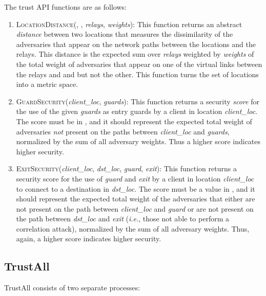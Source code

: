 \documentclass[conference]{styles/IEEEtran}
\newcommand{\ie}{\emph{i.e.}}
\newcommand{\compactify}{\settowidth{\labelsep}{o} \settowidth{\labelwidth}{o} \settowidth{\labelindent}{o}}
\begin{document}
The trust API functions are as follows:

\begin{enumerate}[\compactify]
\item \textsc{LocationDistance}(, , \textit{relays},
    \textit{weights}): This
    function returns an abstract \textit{distance} between two locations that measures the
    dissimilarity of the adversaries that appear on the network paths between the locations and the
    relays. This distance is the expected
    sum over \textit{relays} weighted by \textit{weights} of the total weight of adversaries that
    appear on one of the virtual links between the relays and  and 
    but not the other. This function turns the set of locations into a metric space.

\item \textsc{GuardSecurity}(\textit{client\_loc}, \textit{guards}): This
    function returns a security \textit{score} for the use of the given \textit{guards} as entry
    guards by a client in location \textit{client\_loc}. The score must be in , and it
    should represent the expected total weight of adversaries \emph{not} present on the paths
    between \textit{client\_loc} and \textit{guards}, normalized by the sum
    of all adversary weights. Thus a higher score indicates higher security.

\item \textsc{ExitSecurity}(\textit{client\_loc}, \textit{dst\_loc}, \textit{guard},
    \textit{exit}): This function returns a security score for the use of \textit{guard} and
    \textit{exit} by a client in location \textit{client\_loc} to connect to a destination in
    \textit{dst\_loc}. The score must be a value in , and it should
    represent the expected total weight of the adversaries that either are not present on the path
    between \textit{client\_loc} and \textit{guard} or are not present on the path between
    \textit{dst\_loc} and
    \textit{exit} (\ie{}, those not able to perform a correlation attack), normalized by the sum of
    all adversary weights. Thus, again, a higher score indicates higher security.
\end{enumerate}

\subsection{TrustAll}
TrustAll consists of two separate processes:
\end{document}
